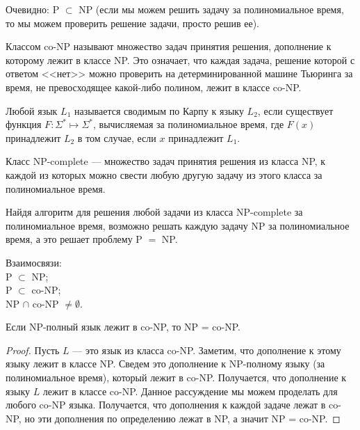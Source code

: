     \begin{Rem}
        Очевидно: P $\subset$ NP (если мы можем решить задачу за полиномиальное время, то мы можем проверить решение задачи, просто решив ее).
    \end{Rem}
    \begin{Def}
        Классом co-NP называют множество задач принятия решения, дополнение к которому лежит в классе NP. Это означает, что каждая задача, решение которой с ответом <<нет>> можно проверить на детерминированной машине Тьюринга за время, не превосходящее какой-либо полином, лежит в классе co-NP.
    \end{Def}
    
    
    \begin{Def}
        Любой язык $L_1$ называется сводимым по Карпу к языку $L_2$, если существует функция $F\colon \Sigma ^{*}\mapsto \Sigma ^{*}$, вычисляемая за полиномиальное время, где $F(x)$ принадлежит $L_2$ в том случае, если $x$ принадлежит $L_1$. 
    \end{Def}
    \begin{Def}
        Класс NP-complete --- множество задач принятия решения из класса NP, к каждой из которых можно свести $\textbf{любую}$ другую задачу из этого класса за полиномиальное время.
    \end{Def}
    \begin{Rem}
        Найдя алгоритм для решения любой задачи из класса NP-complete за полиномиальное время, возможно решать каждую задачу NP за полиномиальное время, а это решает проблему P $=$ NP.
    \end{Rem}
    
    
    \begin{Rem}
        Взаимосвязи:\\
        P $\subset$ NP;\\
        P $\subset$ co-NP;\\
        NP $\cap$ co-NP $\neq \emptyset$.
    \end{Rem}
    
        
    \begin{Thm}
        Если NP-полный язык лежит в co-NP, то NP = co-NP.
    \end{Thm}
    \begin{proof}
        Пусть $L$ --- это язык из класса co-NP. Заметим, что дополнение к этому языку лежит в классе NP. Сведем это дополнение к NP-полному языку (за полиномиальное время), который лежит в co-NP. Получается, что дополнение к языку $L$ лежит в классе co-NP. Данное рассуждение мы можем проделать для любого co-NP языка. Получается, что дополнения к каждой задаче лежат в co-NP, но эти дополнения по определению лежат в NP, а значит NP = co-NP.
    \end{proof}

